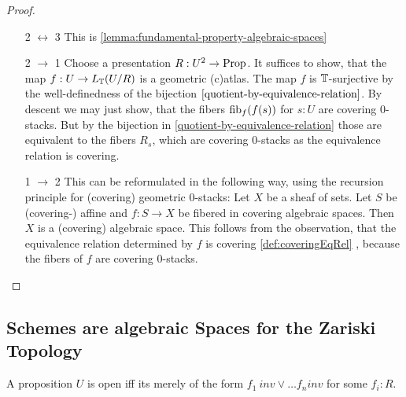 \begin{proof}
\ 	\begin{enumerate}
	\item [2 $\leftrightarrow$ 3]
		This is \ref {lemma:fundamental-property-algebraic-spaces}
	\item [2 $\to$ 1]
	Choose a presentation $ R: U^2 \to \operatorname{Prop}$.
	It suffices to show, that the map $f : U \to L_{\mathbb{T}} ( U / R)$ is a geometric (c)atlas. The map $f$ is $\mathbb{T}$-surjective by the well-definedness of the bijection $\ref{quotient-by-equivalence-relation}$. By descent we may just show, that the fibers $\operatorname{fib}_f (f(s))$ for $s : U$ are covering 0-stacks. But by the bijection in \ref{quotient-by-equivalence-relation} those are equivalent to the fibers $R_s$, which are covering 0-stacks as the equivalence relation is covering. \\
	\item [1 $\to$ 2]
	This can be reformulated in the following way, using the recursion principle for (covering) geometric 0-stacks:
	Let $X$ be a sheaf of sets. Let $S$ be (covering-) affine and $f : S \to X$ be fibered in covering algebraic spaces. Then $X$ is a (covering) algebraic space.
This follows from the observation, that the equivalence relation determined by $f$ is covering \ref{def:coveringEqRel} , because the fibers of $f$ are covering 0-stacks.
	\end{enumerate}
\end{proof}
\subsection{Schemes are algebraic Spaces for the Zariski Topology}
\begin{definition}
 A proposition $U$ is open iff its merely of the form $f_1 \ inv \lor \hdots f_n inv$ for some $f_i : R$.
\end{definition}

